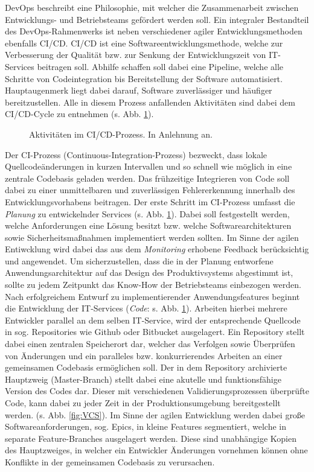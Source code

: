 DevOps beschreibt eine Philosophie, mit welcher die Zusammenarbeit zwischen Entwicklungs- und Betriebsteams gefördert werden soll. Ein integraler Bestandteil des DevOps-Rahmenwerks ist neben verschiedener agiler Entwicklungsmethoden ebenfalls \ac*{CI/CD}. CI/CD ist eine Softwareentwicklungsmethode, welche zur Verbesserung der Qualität bzw. zur Senkung der Entwicklungszeit von IT-Services beitragen soll. Abhilfe schaffen soll dabei eine Pipeline, welche alle Schritte von Codeintegration bis Bereitstellung der Software automatisiert. Hauptaugenmerk liegt dabei darauf, Software zuverlässiger und häufiger bereitzustellen. Alle in diesem Prozess anfallenden Aktivitäten sind dabei dem CI/CD-Cycle zu entnehmen (s. Abb. \ref*{fig:CICD_Cycle}).
\begin{center}
	\begin{figure}[H]
		\centering
		\caption[Aktivitäten im CI/CD-Prozess]{Aktivitäten im CI/CD-Prozess. In Anlehnung an.}
		\label{fig:CICD_Cycle}
	\end{figure}
\end{center}
\vspace*{-10mm}
Der \acs*{CI}-Prozess (Continuous-Integration-Prozess) bezweckt, dass lokale Quellcode\-änderungen in kurzen Intervallen und so schnell wie möglich in eine zentrale Codebasis geladen werden. Das frühzeitige Integrieren von Code soll dabei zu einer unmittelbaren und zuverlässigen Fehlererkennung innerhalb des Entwicklungsvorhabens beitragen. Der erste Schritt im CI-Prozess umfasst die \textit{Planung} zu entwickelnder Services (s. Abb. \ref*{fig:CICD_Cycle}). Dabei soll festgestellt werden, welche Anforderungen eine Lösung besitzt bzw. welche Softwarearchitekturen sowie Sicherheitsmaßnahmen implementiert werden sollten. Im Sinne der agilen Entiwcklung wird dabei das aus dem \textit{Monitoring} erhobene Feedback berücksichtig und angewendet. Um sicherzustellen, dass die in der Planung entworfene Anwendungsarchitektur auf das Design des Produktivsystems abgestimmt ist, sollte zu jedem Zeitpunkt das Know-How der Betriebsteams einbezogen werden. Nach erfolgreichem Entwurf zu implementierender Anwendungsfeatures beginnt die Entwicklung der IT-Services (\textit{Code}: s. Abb. \ref*{fig:CICD_Cycle}). Arbeiten hierbei mehrere Entwickler parallel an dem selben IT-Service, wird der entsprechende Quellcode in sog. Repositories wie Github oder Bitbucket ausgelagert. Ein Repository stellt dabei einen zentralen Speicherort dar, welcher das Verfolgen sowie Überprüfen von Änderungen und ein paralleles bzw. konkurrierendes Arbeiten an einer gemeinsamen Codebasis ermöglichen soll. Der in dem Repository archivierte Hauptzweig (Master-Branch) stellt dabei eine akutelle und funktionsfähige Version des Codes dar. Dieser mit verschiedenen Validierungsprozessen überprüfte Code, kann dabei zu jeder Zeit in der Produktionsumgebung bereitgestellt werden. (s. Abb. \ref*{fig:VCS}). Im Sinne der agilen Entwicklung werden dabei große Softwareanforderungen, sog. Epics, in kleine Features segmentiert, welche in separate Feature-Branches ausgelagert werden. Diese sind unabhängige Kopien des Hauptzweiges, in welcher ein Entwickler Änderungen vornehmen können ohne Konflikte in der gemeinsamen Codebasis zu verursachen.
